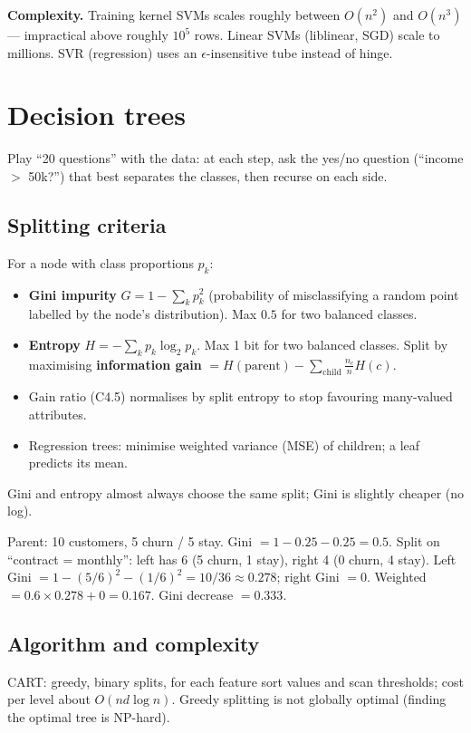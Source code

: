 \textbf{Complexity.} Training kernel SVMs scales roughly between $O(n^2)$ and $O(n^3)$ --- impractical above roughly $10^5$ rows. Linear SVMs (liblinear, SGD) scale to millions. SVR (regression) uses an $\epsilon$-insensitive tube instead of hinge.

\section{Decision trees}

\begin{intuition}
Play ``20 questions'' with the data: at each step, ask the yes/no question (``income $>$ 50k?'') that best separates the classes, then recurse on each side.
\end{intuition}

\subsection{Splitting criteria}
For a node with class proportions $p_k$:
\begin{itemize}
  \item \textbf{Gini impurity} $G=1-\sum_kp_k^2$ (probability of misclassifying a random point labelled by the node's distribution). Max $0.5$ for two balanced classes.
  \item \textbf{Entropy} $H=-\sum_kp_k\log_2p_k$. Max 1 bit for two balanced classes. Split by maximising \textbf{information gain} $=H(\text{parent})-\sum_{\text{child}}\frac{n_c}{n}H(c)$.
  \item Gain ratio (C4.5) normalises by split entropy to stop favouring many-valued attributes.
  \item Regression trees: minimise weighted variance (MSE) of children; a leaf predicts its mean.
\end{itemize}
Gini and entropy almost always choose the same split; Gini is slightly cheaper (no log).

\begin{example}
Parent: 10 customers, 5 churn / 5 stay. Gini $=1-0.25-0.25=0.5$. Split on ``contract = monthly'': left has 6 (5 churn, 1 stay), right 4 (0 churn, 4 stay).
Left Gini $=1-(5/6)^2-(1/6)^2=10/36\approx0.278$; right Gini $=0$. Weighted $=0.6\times0.278+0=0.167$. Gini decrease $=0.333$.
\end{example}

\subsection{Algorithm and complexity}
CART: greedy, binary splits, for each feature sort values and scan thresholds; cost per level about $O(nd\log n)$. Greedy splitting is not globally optimal (finding the optimal tree is NP-hard).

